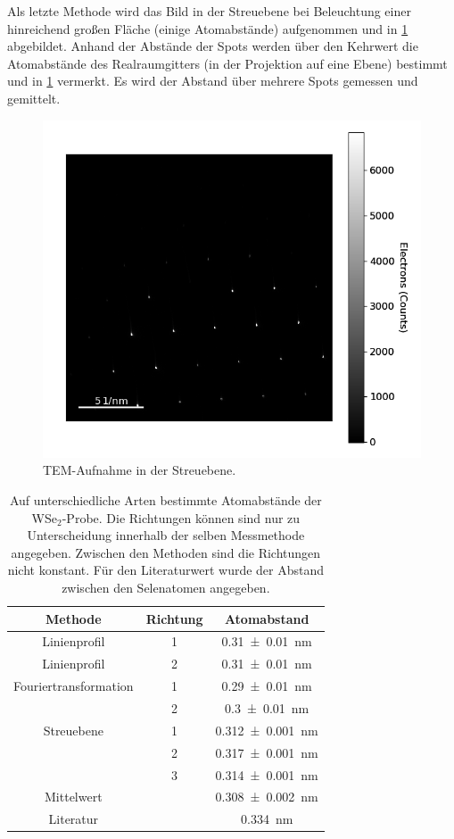   Als letzte Methode wird das Bild in der Streuebene bei Beleuchtung einer hinreichend großen Fläche (einige Atomabstände) aufgenommen und in \cref{fig:diff} abgebildet.
  Anhand der Abstände der Spots werden über den Kehrwert die Atomabstände des Realraumgitters (in der Projektion auf eine Ebene) bestimmt und in \cref{tab:netz} vermerkt.
  Es wird der Abstand über mehrere Spots gemessen und gemittelt.

	\begin{figure}[H]
  \centering
			\includegraphics[width= 0.6 \linewidth]{img/tem_diff}
			\caption{
        TEM-Aufnahme in der Streuebene.
			}
			\label{fig:diff}
	\end{figure}



	\begin{table}
		\centering
		\caption{Auf unterschiedliche Arten bestimmte Atomabstände der WSe$_2$-Probe. Die Richtungen können sind nur zu Unterscheidung innerhalb der selben Messmethode angegeben. Zwischen den Methoden sind die Richtungen nicht konstant.
    Für den Literaturwert wurde der Abstand zwischen den Selenatomen angegeben.}
		\begin{tabular}{c| c | c}
			Methode & Richtung & Atomabstand \\ \hline
      Linienprofil &  1 & \SI{0.31 \pm 0.01}{nm}\\
      Linienprofil &  2 & \SI{0.31 \pm 0.01}{nm}\\
      Fouriertransformation & 1 & \SI{0.29 \pm 0.01}{nm}\\
      & 2 & \SI{0.3 \pm 0.01}{nm}\\
      Streuebene & 1 & \SI{0,312 \pm 0.001}{nm} \\
      & 2 & \SI{0,317 \pm 0.001}{nm} \\
      & 3 & \SI{0,314 \pm 0.001}{nm} \\
      Mittelwert & & \SI{0,308 \pm 0.002}{nm}\\
      Literatur & & \SI{0,334}{nm} \cite{wiki_wse}\\
		\end{tabular}
		\label{tab:netz}
	\end{table}

